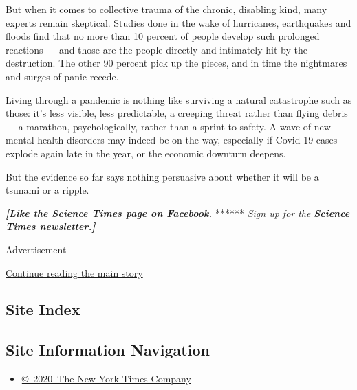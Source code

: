 But when it comes to collective trauma of the chronic, disabling kind,
many experts remain skeptical. Studies done in the wake of hurricanes,
earthquakes and floods find that no more than 10 percent of people
develop such prolonged reactions --- and those are the people directly
and intimately hit by the destruction. The other 90 percent pick up the
pieces, and in time the nightmares and surges of panic recede.

Living through a pandemic is nothing like surviving a natural
catastrophe such as those: it's less visible, less predictable, a
creeping threat rather than flying debris --- a marathon,
psychologically, rather than a sprint to safety. A wave of new mental
health disorders may indeed be on the way, especially if Covid-19 cases
explode again late in the year, or the economic downturn deepens.

But the evidence so far says nothing persuasive about whether it will be
a tsunami or a ripple.

\textbf{\emph{{[}}\href{http://on.fb.me/1paTQ1h}{\emph{Like the Science
Times page on Facebook.}}} ****** \emph{\textbar{} Sign up for the}
\textbf{\href{http://nyti.ms/1MbHaRU}{\emph{Science Times
newsletter.}}\emph{{]}}}

Advertisement

\protect\hyperlink{after-bottom}{Continue reading the main story}

\hypertarget{site-index}{%
\subsection{Site Index}\label{site-index}}

\hypertarget{site-information-navigation}{%
\subsection{Site Information
Navigation}\label{site-information-navigation}}

\begin{itemize}
\tightlist
\item
  \href{https://help.nytimes.com/hc/en-us/articles/115014792127-Copyright-notice}{©~2020~The
  New York Times Company}
\end{itemize}

